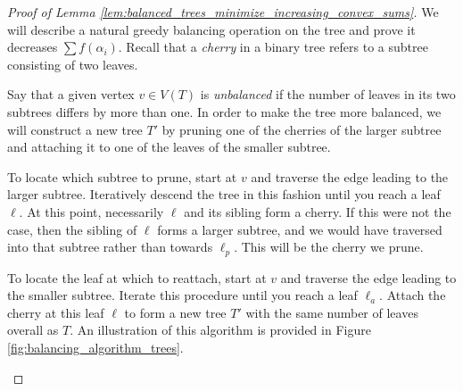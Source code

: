 \documentclass[10pt,oneside,reqno]{article}
\theoremstyle{plain}
\theoremstyle{definition}
\numberwithin{equation}{section}
\begin{document}
\begin{proof}[Proof of Lemma \ref{lem:balanced_trees_minimize_increasing_convex_sums}]
\noindent We will describe a natural greedy balancing operation on the tree and prove it decreases $\sum f(\alpha_i)$. Recall that a \textit{cherry} in a binary tree refers to a subtree consisting of two leaves.

Say that a given vertex $v \in V(T)$ is \textit{unbalanced} if the number of leaves in its two subtrees differs by more than one. In order to make the tree more balanced, we will construct a new tree $T'$ by pruning one of the cherries of the larger subtree and attaching it to one of the leaves of the smaller subtree.

To locate which subtree to prune, start at $v$ and traverse the edge leading to the larger subtree. Iteratively descend the tree in this fashion until you reach a leaf $\ell$. At this point, necessarily $\ell$ and its sibling form a cherry. If this were not the case, then the sibling of $\ell$ forms a larger subtree, and we would have traversed into that subtree rather than towards $\ell_p$. This will be the cherry we prune. 

To locate the leaf at which to reattach, start at $v$ and traverse the edge leading to the smaller subtree. Iterate this procedure until you reach a leaf $\ell_a$. Attach the cherry at this leaf $\ell$ to form a new tree $T'$ with the same number of leaves overall as $T$. An illustration of this algorithm is provided in Figure \ref{fig:balancing_algorithm_trees}. 

\begin{figure}[h]
\centering
\begin{minipage}{0.48\textwidth}
\centering
\end{minipage}
\end{figure}
\end{proof}
\end{document}
